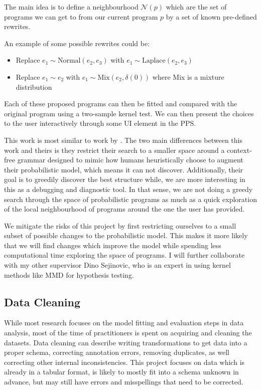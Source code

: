 \documentclass[12pt]{article}
\theoremstyle{definition}
\begin{document}
The main idea is to define a neighbourhood $\mathcal{N}(p)$ which are
the set of programs we can get to from our current program $p$ by a
set of known pre-defined rewrites.

An example of some possible rewrites could be:
\begin{itemize}
\item Replace $e_1 \sim \text{Normal}(e_2, e_3)$ with $e_1 \sim \text{Laplace}(e_2, e_3)$
\item Replace $e_1 \sim e_2$ with $e_1 \sim \text{Mix}(e_2, \delta(0))$ where Mix is a mixture distribution  
\end{itemize}

Each of these proposed programs can then be fitted and compared with
the original program using a two-sample kernel test. We can then present
the choices to the user interactively through some UI element in the PPS.

This work is most similar to work by \citet{grosse2012a}. The two main
differences between this work and theirs is they restrict their search
to a smaller space around a context-free grammar designed to mimic how
humans heuristically choose to augment their probabilistic model,
which means it can not discover. Additionally, their goal is to
greedily discover the best structure while, we are more interesting in
this as a debugging and diagnostic tool. In that sense, we are not
doing a greedy search through the space of probabilistic programs as
much as a quick exploration of the local neighbourhood of programs
around the one the user has provided.

We mitigate the risks of this project by first restricting ourselves
to a small subset of possible changes to the probabilistic model. This
makes it more likely that we will find changes which improve the model
while spending less computational time exploring the space of
programs.  I will further collaborate with my other supervisor Dino
Sejinovic, who is an expert in using kernel methods like MMD for
hypothesis testing.

\subsection{Data Cleaning}

While most research focuses on the model fitting and evaluation steps
in data analysis, most of the time of practitioners is spent on
acquiring and cleaning the datasets. Data cleaning can describe
writing transformations to get data into a proper schema, correcting
annotation errors, removing duplicates, as well correcting other
internal inconsistencies. This project focuses on data which is
already in a tabular format, is likely to mostly fit into a schema
unknown in advance, but may still have errors and misspellings that
need to be corrected.
\end{document}
